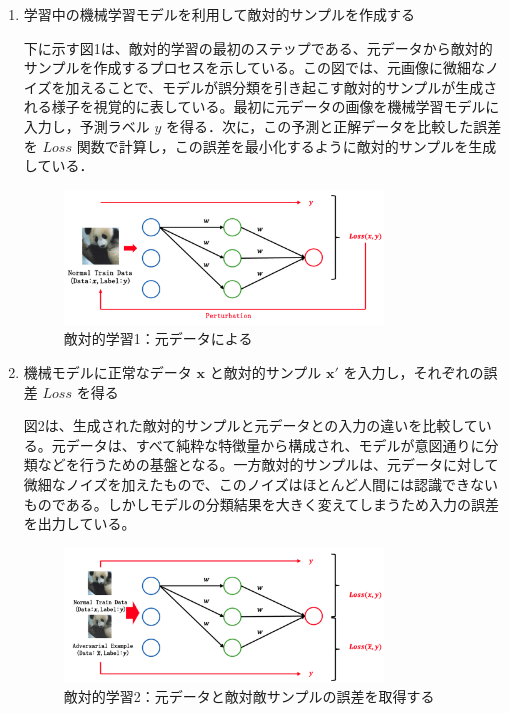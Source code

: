 \begin{enumerate}

    \item 学習中の機械学習モデルを利用して敵対的サンプルを作成する

    下に示す図1は、敵対的学習の最初のステップである、元データから敵対的サンプルを作成するプロセスを示している。この図では、元画像に微細なノイズを加えることで、モデルが誤分類を引き起こす敵対的サンプルが生成される様子を視覚的に表している。最初に元データの画像を機械学習モデルに入力し，予測ラベル $y$ を得る．次に，この予測と正解データを比較した誤差を $Loss$ 関数で計算し，この誤差を最小化するように敵対的サンプルを生成している．
    
    \begin{figure}[H]
        \centering
        \includegraphics[width=0.8\textwidth]{images/敵対的学習1.png}
        \caption{敵対的学習1：元データによる}
        \label{fig:adversarial_learning1}
    \end{figure}
    
    \item 機械モデルに正常なデータ $\bm{x}$ と敵対的サンプル $\bm{x}'$ を入力し，それぞれの誤差 $Loss$ を得る

    図2は、生成された敵対的サンプルと元データとの入力の違いを比較している。元データは、すべて純粋な特徴量から構成され、モデルが意図通りに分類などを行うための基盤となる。一方敵対的サンプルは、元データに対して微細なノイズを加えたもので、このノイズはほとんど人間には認識できないものである。しかしモデルの分類結果を大きく変えてしまうため入力の誤差を出力している。

    \begin{figure}[H]
        \centering
        \includegraphics[width=0.8\textwidth]{images/敵対的学習2.png}
        \caption{敵対的学習2：元データと敵対敵サンプルの誤差を取得する}
        \label{fig:adversarial_learning2}
    \end{figure}


\end{enumerate}
